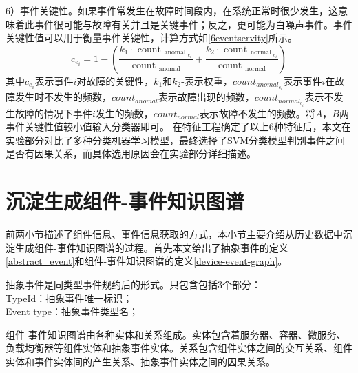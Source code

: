 6）事件关键性。如果事件常发生在故障时间段内，在系统正常时很少发生，这意味着此事件很可能与故障有关并且是关键事件；反之，更可能为白噪声事件。事件关键性值可以用于衡量事件关键性，计算方式如\ref{6eventservity}所示。
\begin{equation}
    c_{e_{i}}=1-\left(\frac{k_{1} \cdot \text { count }_{\text {anomal }_{e_{i}}}}{\text { count }_{\text {anomal }}}+\frac{k_{2} \cdot \text { count }_{\text {normal }_{e_{i}}}}{\text { count }_{\text {normal }}}\right)\label{6eventservity}
\end{equation}
其中$c_{e_i}$表示事件$i$对故障的关键性，$k_1$和$k_2$-表示权重，${count}_{{anomal}_{e_i}}$表示事件$i$在故障发生时不发生的频数，${count}_{anomal}$表示故障出现的频数，${count}_{{normal}_{e_i}}$表示不发生故障的情况下事件$i$发生的频数，${count}_{normal}$表示故障不发生的频数。将$A，B$两事件关键性值较小值输入分类器即可。
在特征工程确定了以上6种特征后，本文在实验部分对比了多种分类机器学习模型，最终选择了SVM分类模型判别事件之间是否有因果关系，而具体选用原因会在实验部分详细描述。

\section{沉淀生成组件-事件知识图谱}\label{graph-generate}

前两小节描述了组件信息、事件信息获取的方式，本小节主要介绍从历史数据中沉淀生成组件-事件知识图谱的过程。首先本文给出了抽象事件的定义\ref{abstract_event}和组件-事件知识图谱的定义\ref{device-event-graph}。
\begin{definition}[抽象事件]
    抽象事件是同类型事件规约后的形式。只包含包括3个部分：
    \\TypeId：抽象事件唯一标识；
    \\Event type：抽象事件类型名；
    \label{abstract_event}
\end{definition}
\begin{definition}[组件-事件知识图谱]
    组件-事件知识图谱由各种实体和关系组成。实体包含着服务器、容器、微服务、负载均衡器等组件实体和抽象事件实体。关系包含组件实体之间的交互关系、组件实体和事件实体间的产生关系、抽象事件实体之间的因果关系。
    \label{device-event-graph}
\end{definition}

